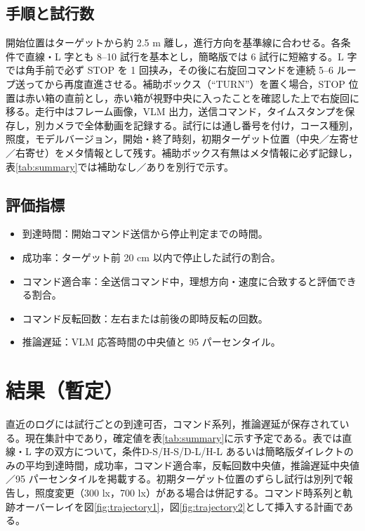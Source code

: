 \documentclass[a4paper,11pt]{ltjsreport}
\begin{document}
\section{手順と試行数}
開始位置はターゲットから約 2.5 m 離し，進行方向を基準線に合わせる。各条件で直線・L 字とも 8--10 試行を基本とし，簡略版では 6 試行に短縮する。L 字では角手前で必ず STOP を 1 回挟み，その後に右旋回コマンドを連続 5--6 ループ送ってから再度直進させる。補助ボックス（“TURN”）を置く場合，STOP 位置は赤い箱の直前とし，赤い箱が視野中央に入ったことを確認した上で右旋回に移る。走行中はフレーム画像，VLM 出力，送信コマンド，タイムスタンプを保存し，別カメラで全体動画を記録する。試行には通し番号を付け，コース種別，照度，モデルバージョン，開始・終了時刻，初期ターゲット位置（中央／左寄せ／右寄せ）をメタ情報として残す。補助ボックス有無はメタ情報に必ず記録し，表\ref{tab:summary}では補助なし／ありを別行で示す。

\section{評価指標}
\begin{itemize}
  \item 到達時間：開始コマンド送信から停止判定までの時間。
  \item 成功率：ターゲット前 20 cm 以内で停止した試行の割合。
  \item コマンド適合率：全送信コマンド中，理想方向・速度に合致すると評価できる割合。
  \item コマンド反転回数：左右または前後の即時反転の回数。
  \item 推論遅延：VLM 応答時間の中央値と 95 パーセンタイル。
\end{itemize}

\chapter{結果（暫定）}
\label{chap:results}
直近のログには試行ごとの到達可否，コマンド系列，推論遅延が保存されている。現在集計中であり，確定値を表\ref{tab:summary}に示す予定である。表では直線・L 字の双方について，条件D-S/H-S/D-L/H-L あるいは簡略版ダイレクトのみの平均到達時間，成功率，コマンド適合率，反転回数中央値，推論遅延中央値／95 パーセンタイルを掲載する。初期ターゲット位置のずらし試行は別列で報告し，照度変更（300 lx，700 lx）がある場合は併記する。コマンド時系列と軌跡オーバーレイを図\ref{fig:trajectory1}，図\ref{fig:trajectory2}として挿入する計画である。
\end{document}
